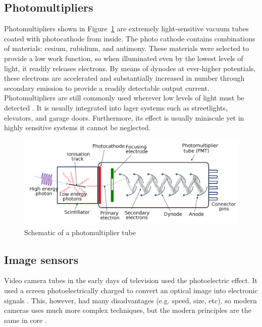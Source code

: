 \documentclass[stu, a4paper, 12pt, floatsintext]{apa7}
\begin{document}
\subsection{Photomultipliers}

Photomultipliers shown in Figure~\ref{fig:photomultiplier} are extremely
light-sensitive vacuum tubes coated with photocathode from inside. The photo
cathode contains combinations of materials: cesium, rubidium, and antimony.
These materials were selected to provide a low work function, so when
illuminated even by the lowest levels of light, it readily releases electrons.
By means of dynodes at ever-higher potentials, these electrons are accelerated
and substantially increased in number through secondary emission to provide a
readily detectable output current. Photomultipliers are still commonly used
wherever low levels of light must be detected \parencite{space}. It is usually
integrated into lager systems such as streetlights, elevators, and garage
doors. Furthermore, its effect is usually miniscule yet in highly sensitive
systems it cannot be neglected.

\begin{figure}[htpb]
    \centering
    \includegraphics[width=\textwidth]{imgs/photomultiplier.png}
    \caption{Schematic of a photomultiplier tube}
    \label{fig:photomultiplier}
\end{figure}

\subsection{Image sensors}

Video camera tubes in the early days of television used the photoelectric
effect. It used a screen photoelectrically charged to convert an
optical image into electronic signals \parencite{tele}. This, however, had many
disadvantages (e.g. speed, size, etc), so modern cameras uses much more complex
techniques, but the modern principles are the same in core \parencite{camera}.
\end{document}
